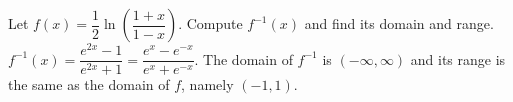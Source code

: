 {\label{inversehyptangent} Let $f(x) = \dfrac{1}{2}\ln\left(\dfrac{1 + x}{1 - x}\right)$.  Compute $f^{-1}(x)$ and find its domain and range.}
{$f^{-1}(x) = \dfrac{e^{2x} - 1}{e^{2x} + 1} = \dfrac{e^{x} - e^{-x}}{e^{x} + e^{-x}}$.  The domain of $f^{-1}$ is $(-\infty, \infty)$ and its range is the same as the domain of $f$, namely $(-1, 1)$.}